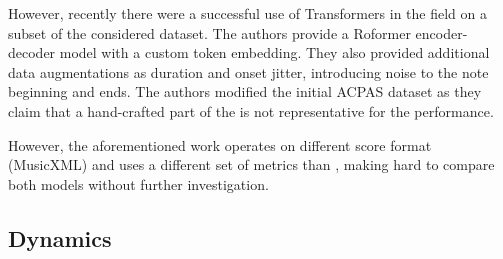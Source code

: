 However, recently there were a successful use of Transformers in the field \cite{Beyer2024} on a subset of the considered dataset. The authors provide a Roformer encoder-decoder model with a custom token embedding. They also provided additional data augmentations as duration and onset jitter, introducing noise to the note beginning and ends. The authors modified the initial ACPAS dataset as they claim that a hand-crafted part of the is not representative for the performance. 

However, the aforementioned work operates on different score format (MusicXML) and uses a different set of metrics than \cite{Liu2022}, making hard to compare both models without further investigation.

\subsection{Dynamics}


